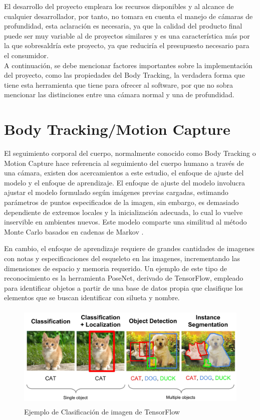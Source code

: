 El desarrollo del proyecto empleara los recursos disponibles y al alcance de cualquier desarrollador, por tanto, no tomara en cuenta el manejo de cámaras de profundidad, esta aclaración es necesaria, ya que la calidad del producto final puede ser muy variable al de proyectos similares y es una característica más por la que sobresaldría este proyecto, ya que reduciría el presupuesto necesario para el consumidor.\\

A continuación, se debe mencionar factores importantes sobre la implementación del proyecto, como las propiedades del Body Tracking, la verdadera forma que tiene esta herramienta que tiene para ofrecer al software, por que no sobra mencionar las distinciones entre una cámara normal y una de profundidad.



\section{Body Tracking/Motion Capture}

El seguimiento corporal del cuerpo, normalmente conocido como Body Tracking o Motion Capture hace referencia al seguimiento del cuerpo humano a través de una cámara, existen dos acercamientos a este estudio, el enfoque de ajuste del modelo y el enfoque de aprendizaje. El enfoque de ajuste del modelo involucra ajustar el modelo formulado según imágenes previas cargadas, estimando parámetros de puntos especificados de la imagen, sin embargo, es demasiado dependiente de extremos locales y la inicialización adecuada, lo cual lo vuelve inservible en ambientes nuevos. Este modelo comparte una similitud al método Monte Carlo basados en cadenas de Markov \cite{siddiqui2010human}.

En cambio, el enfoque de aprendizaje requiere de grandes cantidades de imagenes con notas y especificaciones del esqueleto en las imagenes, incrementando las dimensiones de espacio y memoria requerido. Un ejemplo de este tipo de reconocimiento es la herramienta PoseNet, derivado de TensorFlow, empleado para identificar objetos a partir de una base de datos propia que clasifique los elementos que se buscan identificar con silueta y nombre.

\begin{figure}[t!]
	\centering
	\includegraphics[width=13cm,height=5cm,]{./Images/ejemplotensorflow.jpg}
	\caption{Ejemplo de Clasificación de imagen de TensorFlow}
	\label{tensorfl}
\end{figure}

